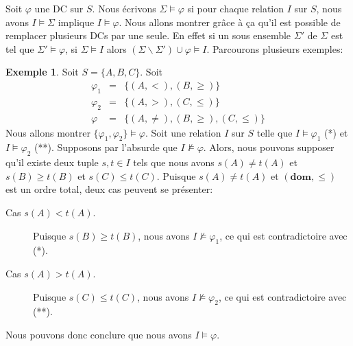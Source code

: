 \documentclass[letterpaper, 12pt]{report}
\theoremstyle{definition}
\newtheorem{myexample}{Exemple}
\newcommand{\dom}{\mathbf{dom}}
\begin{document}
Soit $\varphi$ une DC sur $S$. Nous écrivons $\Sigma \models \varphi$ si pour chaque relation $I$ sur $S$, nous avons $I \models \Sigma$ implique $I \models \varphi$. Nous allons montrer grâce à ça qu'il est possible de remplacer plusieurs DCs par une seule. En effet si un sous ensemble $\Sigma'$ de $\Sigma$ est tel que $\Sigma' \models \varphi$, si $\Sigma \models I$ alors $(\Sigma \backslash \Sigma') \cup \varphi \models I$. Parcourons plusieurs exemples:
\begin{myexample}
\label{firstEx}
Soit $S=\{A,B,C\}$.
Soit
\begin{eqnarray*}
\varphi_{1} & = & \{(A,<), (B,\geq)\}\\
\varphi_{2} & = & \{(A,>), (C,\leq)\}\\
\varphi & = & \{(A,\neq), (B,\geq), (C,\leq)\}
\end{eqnarray*}
Nous allons montrer $\{\varphi_{1},\varphi_{2}\}\models\varphi$.
Soit une relation $I$ sur $S$ telle que $I\models\varphi_{1}$ (*) et $I\models\varphi_{2}$ (**).
Supposons par l'absurde que $I\not\models\varphi$.
Alors, nous pouvons supposer qu'il existe deux tuple $s,t\in I$ tels que nous avons
$s(A)\neq t(A)$ et $s(B)\geq t(B)$ et $s(C)\leq t(C)$.
Puisque $s(A)\neq t(A)$ et $(\dom,\leq)$ est un ordre total,
deux cas peuvent se présenter:
\begin{description}
\item[Cas $s(A)<t(A)$.]
Puisque $s(B)\geq t(B)$, nous avons $I\not\models\varphi_{1}$, ce qui est contradictoire avec (*).
\item[Cas $s(A)>t(A)$.]
Puisque $s(C)\leq t(C)$, nous avons $I\not\models\varphi_{2}$, ce qui est contradictoire avec (**).
\end{description}
Nous pouvons donc conclure que nous avons $I\models\varphi$.
\end{myexample}
\end{document}
